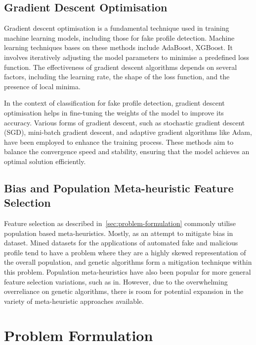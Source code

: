 \documentclass[conference]{IEEEtran}
\begin{document}
\subsection{Gradient Descent Optimisation}

Gradient descent optimisation is a fundamental technique used in training machine learning models, including those for fake profile detection. Machine learning techniques bases on these methods include AdaBoost, XGBoost. It involves iteratively adjusting the model parameters to minimise a predefined loss function. The effectiveness of gradient descent algorithms depends on several factors, including the learning rate, the shape of the loss function, and the presence of local minima.

In the context of classification for fake profile detection, gradient descent optimisation helps in fine-tuning the weights of the model to improve its accuracy. Various forms of gradient descent, such as stochastic gradient descent (SGD), mini-batch gradient descent, and adaptive gradient algorithms like Adam, have been employed to enhance the training process. These methods aim to balance the convergence speed and stability, ensuring that the model achieves an optimal solution efficiently\cite{PurbaEtAl2020}.

\subsection{Bias and Population Meta-heuristic Feature Selection}

Feature selection as described in~\autoref{sec:problem-formulation} commonly utilise population based meta-heuristics. Mostly, as an attempt to mitigate bias in dataset. Mined datasets for the applications of automated fake and malicious profile tend to have a problem where they are a highly skewed representation of the overall population, and genetic algorithms form a mitigation technique within this problem\cite{AkyonKalfaoglu2019,KaushikEtAl2022}. Population meta-heuristics have also been popular for more general feature selection variations, such as in\cite{AltunbeyOzbayAlatas2019,ArabAlfi2015,CottaEtAl2018}. However, due to the overwhelming overreliance on genetic algorithms, there is room for potential expansion in the variety of meta-heuristic approaches available.


\section{Problem Formulation}\label{sec:problem-formulation}
\end{document}

